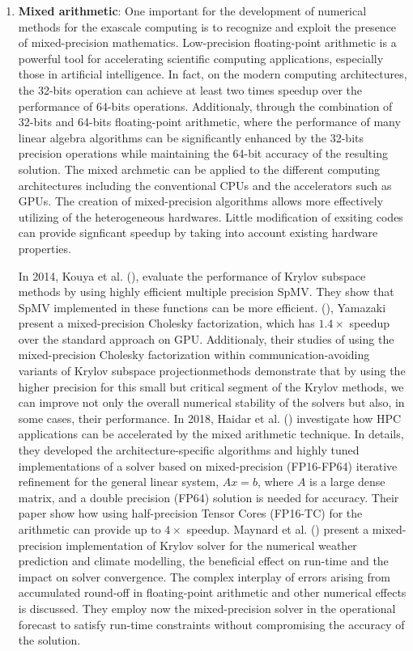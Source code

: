 \begin{enumerate}
	\item \textbf{Mixed arithmetic}: One important for the development of numerical methods for the exascale computing is to recognize and exploit the presence of mixed-precision mathematics. Low-precision floating-point arithmetic is a powerful tool for accelerating scientific computing applications, especially those in artificial intelligence. In fact, on the modern computing architectures, the 32-bits operation can achieve at least two times speedup over the performance of 64-bits operations. Additionaly, through the combination of 32-bits and 64-bits floating-point arithmetic, where the performance of many linear algebra algorithms can be significantly enhanced by the 32-bits precision operations while maintaining the 64-bit accuracy of the resulting solution. The mixed archmetic can be applied to the different computing architectures including the conventional CPUs and the accelerators such as GPUs. The creation of mixed-precision algorithms allows more effectively utilizing of the heterogeneous hardwares. Little modification of exsiting codes can provide signficant speedup by taking into account existing hardware properties. 
	
	In 2014, Kouya et al. (\cite{kouya2014highly}), evaluate the performance of Krylov subspace methods by using highly efficient multiple precision SpMV. They show that SpMV implemented in these functions can be more efficient. (\cite{yamazaki2015mixed}), Yamazaki present a mixed-precision Cholesky factorization, which has $1.4\times$ speedup over the standard approach on GPU. Additionaly, their studies of  using the mixed-precision Cholesky factorization within communication-avoiding variants of Krylov subspace projectionmethods demonstrate that by using the higher precision for this small but critical segment of the Krylov methods, we can improve not only the overall numerical stability of the solvers but also, in some cases, their performance. In 2018, Haidar et al. (\cite{haidar2018harnessing}) investigate how HPC applications can be accelerated by the mixed arithmetic technique. In details, they developed the architecture-specific algorithms and highly tuned implementations of a solver based on mixed-precision (FP16-FP64) iterative refinement for the general linear system, $Ax=b$, where $A$ is a large dense matrix, and a double precision (FP64) solution is needed for accuracy. Their paper show how using half-precision Tensor Cores (FP16-TC) for the arithmetic can provide up to $4\times$ speedup. Maynard et al.  (\cite{maynard2018precision}) present a mixed-precision implementation of Krylov solver for the numerical weather prediction and climate modelling, the beneficial effect on run-time and the impact on solver convergence. The complex interplay of errors arising from accumulated round-off in floating-point arithmetic and other numerical effects is discussed. They employ now the mixed-precision solver in the operational forecast to satisfy run-time constraints without compromising the accuracy of the solution.
	

\end{enumerate}
